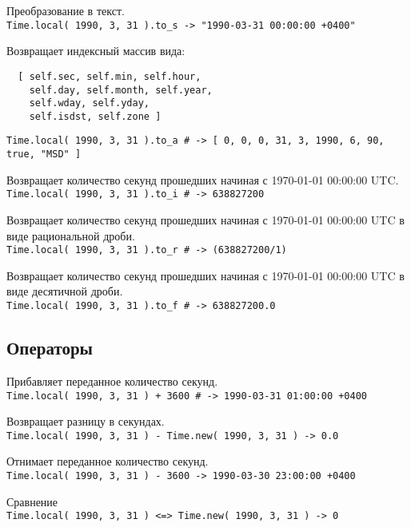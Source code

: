 \begin{methodlist}
  Преобразование в текст. 
  \\\verb!Time.local( 1990, 3, 31 ).to_s -> "1990-03-31 00:00:00 +0400"!
 
  Возвращает индексный массив вида:
  \begin{verbatim}
  [ self.sec, self.min, self.hour,
    self.day, self.month, self.year,
    self.wday, self.yday,
    self.isdst, self.zone ]
  \end{verbatim}   
  \verb!Time.local( 1990, 3, 31 ).to_a # -> [ 0, 0, 0, 31, 3, 1990, 6, 90, true, "MSD" ]!
 
  Возвращает количество секунд прошедших начиная с 1970-01-01 00:00:00 UTC. 
  \\\verb!Time.local( 1990, 3, 31 ).to_i # -> 638827200!
 
  Возвращает количество секунд прошедших начиная с 1970-01-01 00:00:00 UTC в виде рациональной дроби.
  \\\verb!Time.local( 1990, 3, 31 ).to_r # -> (638827200/1)!
 
  Возвращает количество секунд прошедших начиная с 1970-01-01 00:00:00 UTC в виде десятичной дроби.
  \\\verb!Time.local( 1990, 3, 31 ).to_f # -> 638827200.0!
\end{methodlist}

\subsection*{Операторы}

\begin{methodlist}
  Прибавляет переданное количество секунд. 
  \\\verb!Time.local( 1990, 3, 31 ) + 3600 # -> 1990-03-31 01:00:00 +0400!
 
  Возвращает разницу в секундах.
  \\\verb!Time.local( 1990, 3, 31 ) - Time.new( 1990, 3, 31 ) -> 0.0!

  Отнимает переданное количество секунд. 
  \\\verb!Time.local( 1990, 3, 31 ) - 3600 -> 1990-03-30 23:00:00 +0400 !
 
  Сравнение 
  \\\verb!Time.local( 1990, 3, 31 ) <=> Time.new( 1990, 3, 31 ) -> 0!
\end{methodlist}

